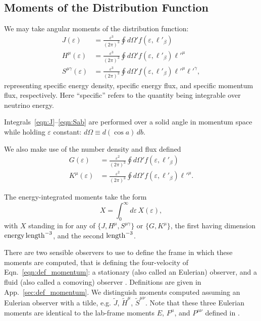 \documentclass[aps,floatfix,prd,superscriptaddress,twocolumn]{revtex4-1}
\newcommand{\todo}[1]{\marginpar{\tiny{\textcolor{red}{#1}}}}
\renewcommand\todo[1]{} %
\begin{document}
\subsection{Moments of the Distribution Function}
\label{ssec:moments}
\todo{code these up}
We may take angular moments of the distribution function:
\begin{align}
  \label{eqn:J}
  J(\varepsilon) &=
  \frac{\varepsilon^3}{(2\pi)^3} \oint d\Omega' f(\varepsilon, \ell'_\beta) \\
  \label{eqn:Ha}
  H^\mu(\varepsilon) &=
  \frac{\varepsilon^3}{(2\pi)^3} \oint d\Omega' f(\varepsilon, \ell'_\beta) \ell'^\mu \\
  \label{eqn:Sab}
  S^{\mu\gamma}(\varepsilon) &=
  \frac{\varepsilon^3}{(2\pi)^3} \oint d\Omega' f(\varepsilon, \ell'_\beta) \ell'^\mu \ell'^\gamma,
\end{align}
representing specific energy density, specific energy flux, and
specific momentum flux, respectively.
Here ``specific'' refers to the quantity being integrable over neutrino energy.
\todo{relate moments to other frames?}
Integrals~\ref{eqn:J}--\ref{eqn:Sab} are performed over a solid angle in
momentum space while holding $\varepsilon$ constant:
$d\Omega \equiv d(\cos a)\,db$.
\todo{consistent with Eqn.~\ref{eqn:def_direction}?}
We also make use of the number density and flux defined
\begin{align}
  \label{eqn:G}
  G(\varepsilon) &=
  \frac{\varepsilon^2}{(2\pi)^3} \oint d\Omega' f(\varepsilon, \ell'_\beta) \\
  \label{eqn:Ka}
  K^\mu(\varepsilon) &=
  \frac{\varepsilon^2}{(2\pi)^3} \oint d\Omega' f(\varepsilon, \ell'_\beta) \ell'^\mu.
\end{align}

The energy-integrated moments take the form
\begin{equation}
  \label{eqn:J_H_S_eps_integrated}
  X = \int_0^\infty d\varepsilon \, X(\varepsilon),
\end{equation}
with $X$ standing in for any of $\{J,H^\mu,S^{\mu\gamma}\}$ or
$\{G,K^\mu\}$,
the first having dimension ${\rm energy}\,{\rm length}^{-3}$,
and the second ${\rm length}^{-3}$.

There are two sensible observers to use to define the frame in which these
moments are computed, that is defining the four-velocity of
Eqn.~\ref{eqn:def_momentum}:
a stationary (also called an Eulerian) observer,
and a fluid (also called a comoving) observer \cite{smar1980-gr_hydro}.
Definitions are given in App.~\ref{sec:def_momentum}.
We distinguish moments computed assuming an Eulerian observer with a tilde,
e.g. $\tilde{J}$, $\tilde{H}^\mu$, $\tilde{S}^{\mu\nu}$.
Note that these three Eulerian moments are identical to the lab-frame moments
$E$, $F^\mu$, and $P^{\mu\nu}$
defined in
\cite{shib2011-truncated_moment, ocon2015-gr1d_with_nu, fouc2015-m1_nsbh}.
\end{document}
